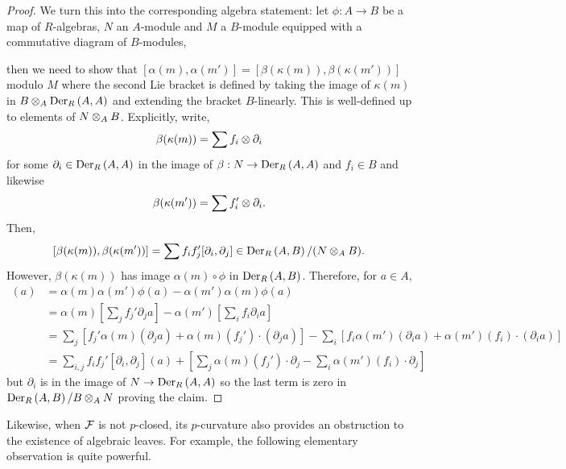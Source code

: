 \documentclass[main.tex]{subfiles}
\begin{document}
\begin{proof}
We turn this into the corresponding algebra statement: let $\phi : A \to B$ be a map of $R$-algebras, $N$ an $A$-module and $M$ a $B$-module equipped with a commutative diagram of $B$-modules,
\begin{center}
\end{center}
then we need to show that $[\alpha(m), \alpha(m')] = [\beta(\kappa(m)), \beta(\kappa(m'))]$ modulo $M$ where the second Lie bracket is defined by taking the image of $\kappa(m)$ in $B \ot_A \Der[R]{A}{A}$ and extending the bracket $B$-linearly. This is well-defined up to elements of $N \ot_A B$. Explicitly, write,
\[ \beta(\kappa(m)) = \sum f_i \ot \partial_i \]
for some $\partial_i \in \Der[R]{A}{A}$ in the image of $\beta : N \to \Der[R]{A}{A}$ and $f_i \in B$ and likewise
\[ \beta(\kappa(m')) = \sum f'_i \ot \partial_i. \]
Then,
\[ [\beta(\kappa(m)), \beta(\kappa(m'))] = \sum f_i f_j' [\partial_i, \partial_j] \in \Der[R]{A}{B}/(N \ot_A B). \]
However, $\beta(\kappa(m))$ has image $\alpha(m) \circ \phi$ in $\Der[R]{A}{B}$. Therefore, for $a \in A$,
\begin{align*}
[\alpha(m), \alpha(m')](a) &= \alpha(m) \alpha(m') \phi(a) - \alpha(m') \alpha(m) \phi(a) 
\\
& = \alpha(m) \left[ \sum_j f_j' \partial_j a \right] - \alpha(m') \left[ \sum_i f_i \partial_i a \right]
\\
& = \sum_j  \left[ f_j' \alpha(m) (\partial_j a) + \alpha(m)(f_j') \cdot (\partial_j a) \right] - \sum_i \left[ f_i \alpha(m') (\partial_i a) + \alpha(m')(f_i) \cdot (\partial_i a) \right]
\\
& = \sum_{i,j} f_i f_j' [\partial_i, \partial_j](a) + \left[ \sum_j \alpha(m)(f_j') \cdot \partial_j - \sum_i \alpha(m')(f_i) \cdot \partial_j \right]
\end{align*}
but $\partial_i$ is in the image of $N \to \Der[R]{A}{A}$ so the last term is zero in $\Der[R]{A}{B} / B \ot_A N$ proving the claim. 
\end{proof}

Likewise, when $\F$ is not $p$-closed, its $p$-curvature also provides an obstruction to the existence of algebraic leaves. For example, the following elementary observation is quite powerful. 
\end{document}

